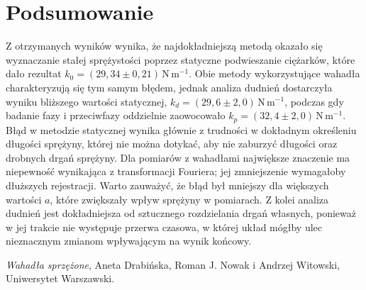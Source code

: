 \documentclass[12pt]{article}
\begin{document}
\section{Podsumowanie}
Z otrzymanych wyników wynika, że najdokładniejszą metodą okazało się wyznaczanie stałej sprężystości poprzez statyczne podwieszanie ciężarków, które dało rezultat \(k_0 = (29{,}34 \pm 0{,}21)\,\mathrm{N\,m^{-1}}\). Obie metody wykorzystujące wahadła charakteryzują się tym samym błędem, jednak analiza dudnień dostarczyła wyniku bliższego wartości statycznej, \(k_d = (29{,}6 \pm 2{,}0)\,\mathrm{N\,m^{-1}}\), podczas gdy badanie fazy i przeciwfazy oddzielnie zaowocowało \(k_p = (32{,}4 \pm 2{,}0)\,\mathrm{N\,m^{-1}}\). Błąd w metodzie statycznej wynika głównie z trudności w dokładnym określeniu długości sprężyny, której nie można dotykać, aby nie zaburzyć długości oraz drobnych drgań sprężyny. Dla pomiarów z wahadłami największe znaczenie ma niepewność wynikająca z transformacji Fouriera; jej zmniejszenie wymagałoby dłuższych rejestracji. Warto zauważyć, że błąd był mniejszy dla większych wartości \(a\), które zwiększały wpływ sprężyny w pomiarach. Z kolei analiza dudnień jest dokładniejsza od sztucznego rozdzielania drgań własnych, ponieważ w jej trakcie nie występuje przerwa czasowa, w której układ mógłby ulec nieznacznym zmianom wpływającym na wynik końcowy.

\newpage

\begin{thebibliography}{1}

	\emph{Wahadła sprzężone}, Aneta Drabińska, Roman J. Nowak i Andrzej Witowski, Uniwersytet Warszawski.

\end{thebibliography}
\end{document}
